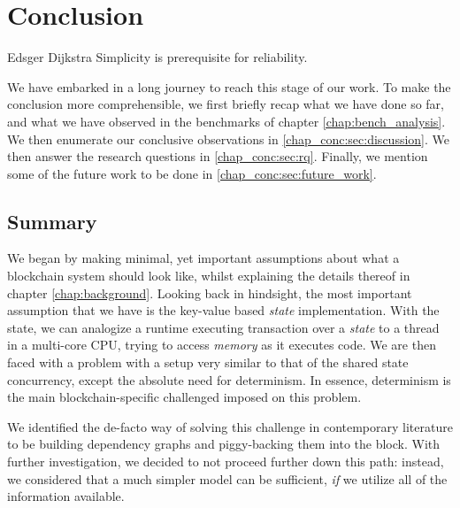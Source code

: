 \chapter{Conclusion} \label{chap:conclusion}

\begin{chapquote}{Edsger Dijkstra}
	Simplicity is prerequisite for reliability.
\end{chapquote}

We have embarked in a long journey to reach this stage of our work. To make the conclusion more
comprehensible, we first briefly recap what we have done so far, and what we have observed in the
benchmarks of chapter \ref{chap:bench_analysis}. We then enumerate our conclusive observations in
\ref{chap_conc:sec:discussion}. We then answer the research questions in \ref{chap_conc:sec:rq}.
Finally, we mention some of the future work to be done in \ref{chap_conc:sec:future_work}.

\section{Summary}

We began by making minimal, yet important assumptions about what a blockchain system should look
like, whilst explaining the details thereof in chapter \ref{chap:background}. Looking back in
hindsight, the most important assumption that we have is the key-value based \textit{state}
implementation. With the state, we can analogize a runtime executing transaction over a
\textit{state} to a thread in a multi-core CPU, trying to access \textit{memory} as it executes
code. We are then faced with a problem with a setup very similar to that of the shared state
concurrency, except the absolute need for determinism. In essence, determinism is the main
blockchain-specific challenged imposed on this problem.

We identified the de-facto way of solving this challenge in contemporary literature to be building
dependency graphs and piggy-backing them into the block. With further investigation, we decided to
not proceed further down this path: instead, we considered that a much simpler model can be
sufficient, \textit{if} we utilize all of the information available.

